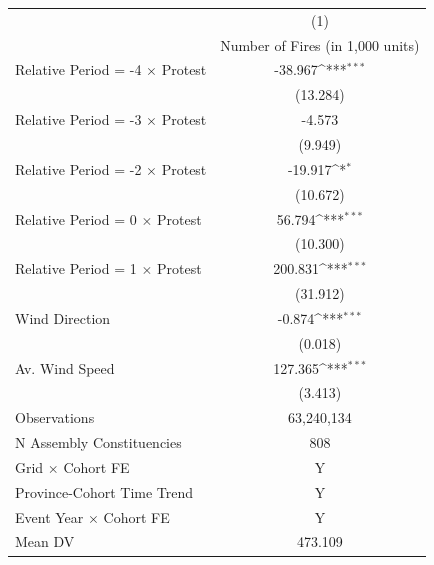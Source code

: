 {
\def\sym#1{\ifmmode^{#1}\else\(^{#1}\)\fi}
\begin{tabular}{l*{1}{c}}
\hline
            & \multicolumn{1}{c}{(1)}             \\
            & \multicolumn{1}{c}{Number of Fires (in 1,000 units)} \\ \hline

Relative Period = -4 $\times$ Protest&     -38.967\sym{***}\\
            &    (13.284)         \\
Relative Period = -3 $\times$ Protest&      -4.573         \\
            &     (9.949)         \\
Relative Period = -2 $\times$ Protest&     -19.917\sym{*}  \\
            &    (10.672)         \\
Relative Period = 0 $\times$ Protest&      56.794\sym{***}\\
            &    (10.300)         \\
Relative Period = 1 $\times$ Protest&     200.831\sym{***}\\
            &    (31.912)         \\
Wind Direction&      -0.874\sym{***}\\
            &     (0.018)         \\
Av. Wind Speed&     127.365\sym{***}\\
            &     (3.413)         \\
\hline
Observations&  63,240,134         \\
N Assembly Constituencies&         808         \\
Grid $\times$ Cohort FE&           Y         \\
Province-Cohort Time Trend&           Y         \\
Event Year $\times$ Cohort FE&           Y         \\
Mean DV     &     473.109         \\
\hline
\end{tabular}
}
